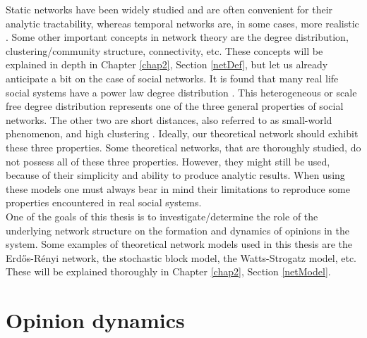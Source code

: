 \documentclass[11 pt , letterpaper , twoside , openright]{book}
\begin{document}
Static networks have been widely studied and are often convenient for their analytic tractability, whereas temporal networks are, in some cases, more realistic \cite{Mata2020}. Some other important concepts in network theory are the degree distribution, clustering/community structure, connectivity, etc. These concepts will be explained in depth in Chapter \ref{chap2}, Section \ref{netDef}, but let us already anticipate a bit on the case of social networks. It is found that many real life social systems have a power law degree distribution \cite{Muchnik2013}. This heterogeneous or scale free degree distribution represents one of the three general properties of social networks. The other two are short distances, also referred to as small-world phenomenon, and high clustering \cite{Muchnik2013}. Ideally, our theoretical network should exhibit these three properties. Some theoretical networks, that are thoroughly studied, do not possess all of these three properties. However, they might still be used, because of their simplicity and ability to produce analytic results. When using these models one must always bear in mind their limitations to reproduce some properties encountered in real social systems. \\
One of the goals of this thesis is to investigate/determine the role of the underlying network structure on the formation and dynamics of opinions in the system. Some examples of theoretical network models used in this thesis are the Erd\H{o}s-R\'{e}nyi network, the stochastic block model, the Watts-Strogatz model, etc. These will be explained thoroughly in Chapter \ref{chap2}, Section \ref{netModel}. %



\section{Opinion dynamics}
\end{document}
